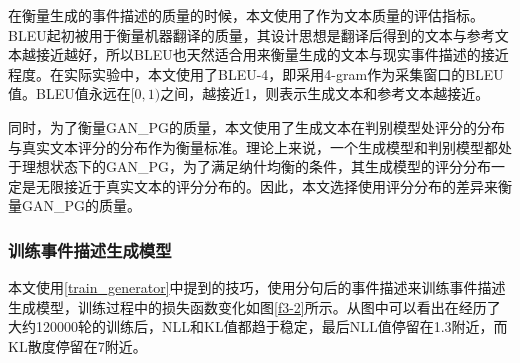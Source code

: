 在衡量生成的事件描述的质量的时候，本文使用了\cite{papineni_bleu:_2002}作为文本质量的评估指标。BLEU起初被用于衡量机器翻译的质量，其设计思想是翻译后得到的文本与参考文本越接近越好，所以BLEU也天然适合用来衡量生成的文本与现实事件描述的接近程度。在实际实验中，本文使用了BLEU-4，即采用4-gram作为采集窗口的BLEU值。BLEU值永远在$[0,1)$之间，越接近1，则表示生成文本和参考文本越接近。

同时，为了衡量GAN\_PG的质量，本文使用了生成文本在判别模型处评分的分布与真实文本评分的分布作为衡量标准。理论上来说，一个生成模型和判别模型都处于理想状态下的GAN\_PG，为了满足纳什均衡的条件，其生成模型的评分分布一定是无限接近于真实文本的评分分布的。因此，本文选择使用评分分布的差异来衡量GAN\_PG的质量。

\subsubsection{训练事件描述生成模型}
本文使用\ref{train_generator}中提到的技巧，使用分句后的事件描述来训练事件描述生成模型，训练过程中的损失函数变化如图\ref{f3-2}所示。从图中可以看出在经历了大约120000轮的训练后，NLL和KL值都趋于稳定，最后NLL值停留在1.3附近，而KL散度停留在7附近。
